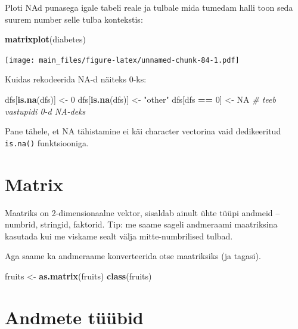 \documentclass[]{book}
\newenvironment{Shaded}{\begin{snugshade}}{\end{snugshade}}
\newcommand{\KeywordTok}[1]{\textcolor[rgb]{0.13,0.29,0.53}{\textbf{#1}}}
\newcommand{\DecValTok}[1]{\textcolor[rgb]{0.00,0.00,0.81}{#1}}
\newcommand{\StringTok}[1]{\textcolor[rgb]{0.31,0.60,0.02}{#1}}
\newcommand{\CommentTok}[1]{\textcolor[rgb]{0.56,0.35,0.01}{\textit{#1}}}
\newcommand{\OtherTok}[1]{\textcolor[rgb]{0.56,0.35,0.01}{#1}}
\newcommand{\OperatorTok}[1]{\textcolor[rgb]{0.81,0.36,0.00}{\textbf{#1}}}
\newcommand{\NormalTok}[1]{#1}
\begin{document}
Ploti NAd punasega igale tabeli reale ja tulbale mida tumedam halli toon
seda suurem number selle tulba kontekstis:

\begin{Shaded}
\begin{Highlighting}[]
\KeywordTok{matrixplot}\NormalTok{(diabetes) }
\end{Highlighting}
\end{Shaded}

\texttt{[image: main\_files/figure-latex/unnamed-chunk-84-1.pdf]}

Kuidas rekodeerida NA-d näiteks 0-ks:

\begin{Shaded}
\begin{Highlighting}[]
\NormalTok{dfs[}\KeywordTok{is.na}\NormalTok{(dfs)] <-}\StringTok{ }\DecValTok{0}
\NormalTok{dfs[}\KeywordTok{is.na}\NormalTok{(dfs)] <-}\StringTok{ "other"}
\NormalTok{dfs[dfs }\OperatorTok{==}\StringTok{ }\DecValTok{0}\NormalTok{] <-}\StringTok{ }\OtherTok{NA} \CommentTok{# teeb vastupidi 0-d NA-deks}
\end{Highlighting}
\end{Shaded}

Pane tähele, et NA tähistamine ei käi character vectorina vaid
dedikeeritud \texttt{is.na()} funktsiooniga.

\section{Matrix}\label{matrix}

Maatriks on 2-dimensionaalne vektor, sisaldab ainult ühte tüüpi andmeid
-- numbrid, stringid, faktorid. Tip: me saame sageli andmeraami
maatriksina kasutada kui me viskame sealt välja mitte-numbrilised
tulbad.

Aga saame ka andmeraame konverteerida otse maatriksiks (ja tagasi).

\begin{Shaded}
\begin{Highlighting}[]
\NormalTok{fruits <-}\StringTok{ }\KeywordTok{as.matrix}\NormalTok{(fruits)}
\KeywordTok{class}\NormalTok{(fruits)}
\end{Highlighting}
\end{Shaded}

\section{Andmete tüübid}\label{andmete-tuubid}
\end{document}
